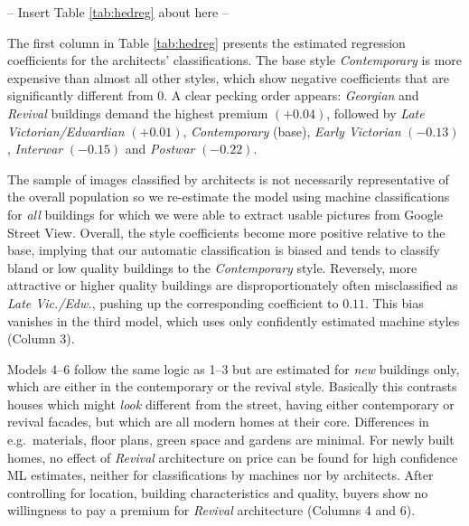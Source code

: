 \documentclass[]{article}
\begin{document}
\begin{center}
  -- Insert Table \ref{tab:hedreg} about here --
\end{center}

The first column in Table \ref{tab:hedreg} presents the estimated
regression coefficients for the architects' classifications. The base
style \emph{Contemporary} is more expensive than almost all other
styles, which show negative coefficients that are significantly
different from 0. A clear pecking order appears: \emph{Georgian} and
\emph{Revival} buildings demand the highest premium \((+0.04)\),
followed by \emph{Late Victorian/Edwardian} \((+0.01)\),
\emph{Contemporary} (base), \emph{Early Victorian} \((-0.13)\),
\emph{Interwar} \((-0.15)\) and \emph{Postwar} \((-0.22)\).

The sample of images classified by architects is not necessarily
representative of the overall population so we re-estimate the model
using machine classifications for \emph{all} buildings for which we were
able to extract usable pictures from Google Street View. Overall, the
style coefficients become more positive relative to the base, implying
that our automatic classification is biased and tends to classify bland
or low quality buildings to the \emph{Contemporary} style. Reversely,
more attractive or higher quality buildings are disproportionately often
misclassified as \emph{Late Vic./Edw.}, pushing up the corresponding
coefficient to \(0.11\). This bias vanishes in the third model, which
uses only confidently estimated machine styles (Column 3).

Models 4--6 follow the same logic as 1--3 but are estimated for
\emph{new} buildings only, which are either in the contemporary or the
revival style. Basically this contrasts houses which might \emph{look}
different from the street, having either contemporary or revival
facades, but which are all modern homes at their core. Differences in
e.g.~materials, floor plans, green space and gardens are minimal. For
newly built homes, no effect of \emph{Revival} architecture on price can
be found for high confidence ML estimates, neither for classifications
by machines nor by architects. After controlling for location, building
characteristics and quality, buyers show no willingness to pay a premium
for \emph{Revival} architecture (Columns 4 and 6).
\end{document}
